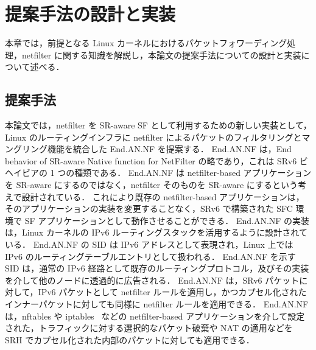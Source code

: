 \chapter{提案手法の設計と実装}
\label{chap:design_and_impl}
本章では，前提となる Linux カーネルにおけるパケットフォワーディング処理，netfilter に関する知識を解説し，本論文の提案手法についての設計と実装について述べる．

\section{提案手法}
\label{section:proposal-method}
本論文では，netfilter を SR-aware SF として利用するための新しい実装として，Linux のルーティングインフラに netfilter によるパケットのフィルタリングとマングリング機能を統合した End.AN.NF を提案する．
End.AN.NF は，End behavior of SR-aware Native function for NetFilter の略であり，これは SRv6 ビヘイビアの 1 つの種類である．
End.AN.NF は netfilter-based アプリケーションを SR-aware にするのではなく，netfilter そのものを SR-aware にするという考えで設計されている．
これにより既存の netfilter-based アプリケーションは，そのアプリケーションの実装を変更することなく，SRv6 で構築された SFC 環境で SF アプリケーションとして動作させることができる．
End.AN.NF の実装は，Linux カーネルの IPv6 ルーティングスタックを活用するように設計されている．
End.AN.NF の SID は IPv6 アドレスとして表現され，Linux 上では IPv6 のルーティングテーブルエントリとして扱われる．
End.AN.NF を示す SID は，通常の IPv6 経路として既存のルーティングプロトコル，及びその実装を介して他のノードに透過的に広告される．
End.AN.NF は，SRv6 パケットに対して，IPv6 パケットとして netfilter ルールを適用し，かつカプセル化されたインナーパケットに対しても同様に netfilter ルールを適用できる．
End.AN.NF は，nftables\cite{nftables} や iptables~\cite{iptables} などの netfilter-based アプリケーションを介して設定された，トラフィックに対する選択的なパケット破棄や NAT の適用などを SRH でカプセル化された内部のパケットに対しても適用できる．

